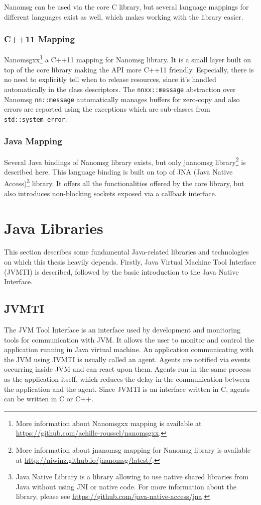 Nanomsg can be used via the core C library, but several language mappings for different languages exist as well, which makes working with the library easier.
\subsubsection{C++11 Mapping}
Nanomsgxx\footnote{More information about Nanomsgxx mapping is available at \url{https://github.com/achille-roussel/nanomsgxx}.} a C++11 mapping for Nanomsg library. It is a small layer built on top of the core library making the API more C++11  friendly. Especially, there is no need to explicitly tell when to release resources, since it's handled automatically in the class descriptors. The \texttt{nnxx::message} abstraction over Nanomsg \texttt{nn::message} automatically manages buffers for zero-copy and also errors are reported using the exceptions which are sub-classes from \texttt{std::system\_error}.
\subsubsection{Java Mapping}
Several Java bindings of Nanomsg library exists, but only jnanomsg library\footnote{More information about jnanomsg mapping for Nanomsg library is available at \url{http://niwinz.github.io/jnanomsg/latest/}.}  is described here. This language binding is built on top of JNA (Java Native Access)\footnote{Java Native Library is a library allowing to use native shared libraries from Java without using JNI or native code. For more information about the library, please see \url{https://github.com/java-native-access/jna}.} library. It offers all the functionalities offered by the core library, but also introduces non-blocking sockets exposed via a callback interface.

\section{Java Libraries}
This section describes some fundamental Java-related libraries and technologies on which this thesis heavily depends. Firstly, Java Virtual Machine Tool Interface (JVMTI) is described, followed by the basic introduction to the Java Native Interface.
\subsection{JVMTI}
\label{JVMTI}
The JVM Tool Interface is an interface used by development and monitoring tools for communication with JVM. It allows the user to monitor and control the application running in Java virtual machine. An application communicating with the JVM using JVMTI is usually called an agent. Agents are notified via events occurring inside JVM and can react upon them. Agents run in the same process as the application itself, which reduces the delay in the communication between the application and the agent. Since JVMTI is an interface written in C, agents can be written in C or C++. 

